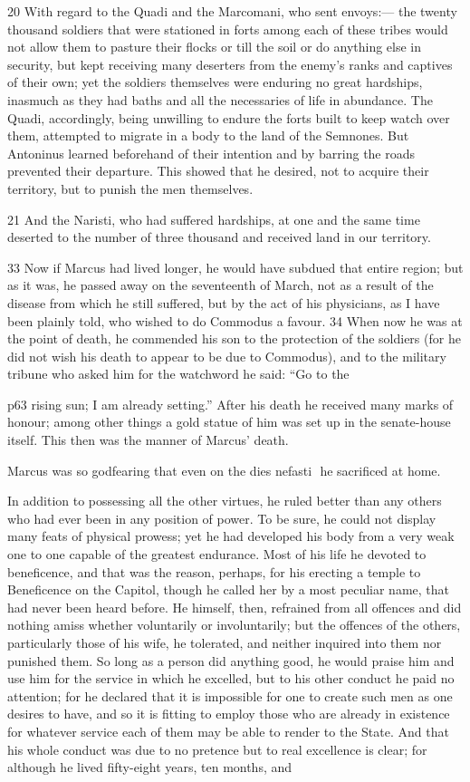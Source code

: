 20
With regard to the Quadi and the Marcomani, who sent envoys:\texthebrew{—} the twenty thousand soldiers that were stationed in forts among each of these tribes would not allow them to pasture their flocks or till the soil or do anything else in security, but kept receiving many deserters from the enemy's ranks and captives of their own; yet the soldiers themselves were enduring no great hardships, inasmuch as they had baths and all the necessaries of life in abundance. The Quadi, accordingly, being unwilling to endure the forts built to keep watch over them, attempted to migrate in a body to the land of the Semnones. But Antoninus learned beforehand of their intention and by barring the roads prevented their departure. This showed that he desired, not to acquire their territory, but to punish the men themselves.

21
And the Naristi, who had suffered hardships, at one and the same time deserted to the number of three thousand and received land in our territory.

33
Now if Marcus had lived longer, he would have subdued that entire region; but as it was, he passed away on the seventeenth of March, not as a result of the disease from which he still suffered, but by the act of his physicians, as I have been plainly told, who wished to do Commodus a favour. 34 When now he was at the point of death, he commended his son to the protection of the soldiers (for he did not wish his death to appear to be due to Commodus), and to the military tribune who asked him for the watchword he said: ``Go to the

p63 rising sun; I am already setting.'' After his death he received many marks of honour; among other things a gold statue of him was set up in the senate-house itself. This then was the manner of Marcus' death.

Marcus was so godfearing that even on the dies nefasti \texthebrew{⁠} he sacrificed at home.

In addition to possessing all the other virtues, he ruled better than any others who had ever been in any position of power. To be sure, he could not display many feats of physical prowess; yet he had developed his body from a very weak one to one capable of the greatest endurance. Most of his life he devoted to beneficence, and that was the reason, perhaps, for his erecting a temple to Beneficence on the Capitol, though he called her by a most peculiar name, that had never been heard before.\texthebrew{⁠} He himself, then, refrained from all offences and did nothing amiss whether voluntarily or involuntarily; but the offences of the others, particularly those of his wife, he tolerated, and neither inquired into them nor punished them. So long as a person did anything good, he would praise him and use him for the service in which he excelled, but to his other conduct he paid no attention; for he declared that it is impossible for one to create such men as one desires to have, and so it is fitting to employ those who are already in existence for whatever service each of them may be able to render to the State. And that his whole conduct was due to no pretence but to real excellence is clear; for although he lived fifty-eight years, ten months, and

